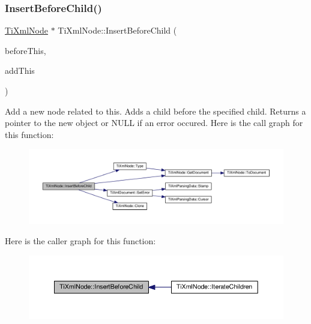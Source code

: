 \subsubsection{\texorpdfstring{Insert\+Before\+Child()}{InsertBeforeChild()}}
{\footnotesize\ttfamily \hyperlink{class_ti_xml_node}{Ti\+Xml\+Node} $\ast$ Ti\+Xml\+Node\+::\+Insert\+Before\+Child (\begin{DoxyParamCaption}\item[{\hyperlink{class_ti_xml_node}{Ti\+Xml\+Node} $\ast$}]{before\+This,  }\item[{const \hyperlink{class_ti_xml_node}{Ti\+Xml\+Node} \&}]{add\+This }\end{DoxyParamCaption})}

Add a new node related to this. Adds a child before the specified child. Returns a pointer to the new object or N\+U\+LL if an error occured. Here is the call graph for this function\+:\nopagebreak
\begin{figure}[H]
\begin{center}
\leavevmode
\includegraphics[width=350pt]{class_ti_xml_node_a71e54e393336382bc9875f64aab5cb15_cgraph}
\end{center}
\end{figure}
Here is the caller graph for this function\+:\nopagebreak
\begin{figure}[H]
\begin{center}
\leavevmode
\includegraphics[width=350pt]{class_ti_xml_node_a71e54e393336382bc9875f64aab5cb15_icgraph}
\end{center}
\end{figure}
\mbox{\label{class_ti_xml_node_af287a913ce46d8dbf7ef24fec69bbaf0}} 
